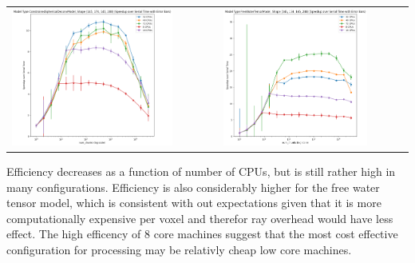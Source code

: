 \documentclass[
  letterpaper,
  DIV=11,
  numbers=noendperiod]{scrartcl}
\begin{document}
\begin{longtable}[]{@{}
  >{\raggedright\arraybackslash}p{}
  >{\raggedright\arraybackslash}p{}@{}}
\toprule\noalign{}
\endhead
\bottomrule\noalign{}
\endlastfoot
\includegraphics[width=0.8\textwidth,height=0.8\textheight]{figures/csdm_speedup.png}
&
\includegraphics[width=0.8\textwidth,height=0.8\textheight]{figures/fwdtim_speedup.png} \\
\end{longtable}

Efficiency decreases as a function of number of CPUs, but is still
rather high in many configurations. Efficiency is also considerably
higher for the free water tensor model, which is consistent with out
expectations given that it is more computationally expensive per voxel
and therefor ray overhead would have less effect. The high efficency of
8 core machines suggest that the most cost effective configuration for
processing may be relativly cheap low core machines.
\end{document}
